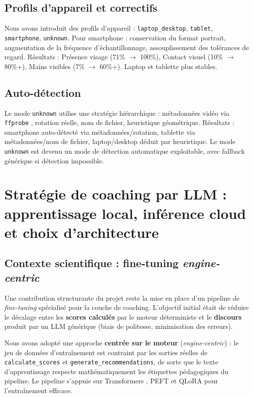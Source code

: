 ﻿\documentclass[12pt,a4paper]{article}
\begin{document}
\subsection{Profils d'appareil et correctifs}
Nous avons introduit des profils d'appareil : \texttt{laptop\_desktop}, \texttt{tablet}, \texttt{smartphone}, \texttt{unknown}. Pour smartphone : conservation du format portrait, augmentation de la fréquence d'échantillonnage, assouplissement des tolérances de regard. Résultats : Présence visage (71\% $\rightarrow$ 100\%), Contact visuel (10\% $\rightarrow$ 80\%+), Mains visibles (7\% $\rightarrow$ 60\%+). Laptop et tablette plus stables.

\subsection{Auto-détection}
Le mode \texttt{unknown} utilise une stratégie hiérarchique : métadonnées vidéo via \texttt{ffprobe} \cite{ffmpeg}, rotation réelle, nom de fichier, heuristique géométrique. Résultats : smartphone auto-détecté via métadonnées/rotation, tablette via métadonnées/nom de fichier, laptop/desktop déduit par heuristique. Le mode \texttt{unknown} est devenu un mode de détection automatique exploitable, avec fallback générique si détection impossible.

\section{Stratégie de coaching par LLM : apprentissage local, inférence cloud et choix d'architecture}

\subsection{Contexte scientifique : fine-tuning \textit{engine-centric}}
Une contribution structurante du projet reste la mise en place d'un pipeline de \textit{fine-tuning} spécialisé pour la couche de coaching. L'objectif initial était de réduire le décalage entre les \textbf{scores calculés} par le moteur déterministe et le \textbf{discours} produit par un LLM générique (biais de politesse, minimisation des erreurs).

Nous avons adopté une approche \textbf{centrée sur le moteur} (\textit{engine-centric}) : le jeu de données d'entraînement est contraint par les sorties réelles de \texttt{calculate\_scores} et \texttt{generate\_recommendations}, de sorte que le texte d'apprentissage respecte mathématiquement les étiquettes pédagogiques du pipeline. Le pipeline s'appuie sur Transformers \cite{transformers}, PEFT \cite{peft} et QLoRA \cite{qlora} pour l'entraînement efficace.
\end{document}
